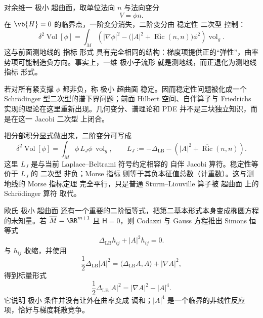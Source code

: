 对余维一 极小 超曲面，取单位法向 $n$ 与法向变分
\[
V=\phi n.
\]
在 $\vb{H}=0$ 的临界点，一阶变分消失，二阶变分由 稳定性 二次型 控制：
\begin{equation}
{
\delta^2\operatorname{Vol}[\phi]
=
\int_M
\left(
|\nabla\phi|^2
-\bigl(|A|^2+\overline{\operatorname{Ric}}(n,n)\bigr)\phi^2
\right)\operatorname{vol}_g
}.
\label{eq:math-dg-minimal-second-variation}
\end{equation}
这与前面测地线的 指标 形式 具有完全相同的结构：梯度项提供正的``弹性''，曲率势项可能制造负方向。事实上，一维 极小子流形 就是测地线，而正退化为测地线 指标 形式。

若对所有紧支撑 $\phi$ 都非负，称 极小 超曲面 稳定。因而稳定性问题被化成一个 Schrödinger 型二次型的谱下界问题；前面 Hilbert 空间、自伴算子与 Friedrichs 实现的理论在这里重新出现。几何变分、谱理论和 PDE 并不是三块独立知识，而是在这一 Jacobi 二次型 上闭合。

把分部积分显式做出来，二阶变分可写成
\begin{equation*}\delta^2\operatorname{Vol}[\phi]
=\int_M\phi\,L_J\phi\,\operatorname{vol}_g,
\qquad
L_J:=-\Delta_{\mathrm{LB}}
-\left(|A|^2+\overline{\operatorname{Ric}}(n,n)\right).\end{equation*}
这里 $L_J$ 是与当前 Laplace--Beltrami 符号约定相容的 自伴 Jacobi 算符。稳定性等价于 $L_J$ 的 二次型 非负；Morse 指标 则等于其负本征值总数（计重数）。这与测地线的 Morse 指标定理 完全平行，只是普通 Sturm--Liouville 算子被 超曲面 上的 Schrödinger 算符 取代。

欧氏 极小 超曲面 还有一个重要的二阶恒等式，把第二基本形式本身变成椭圆方程的未知量。若 $\overline M=\RR^{m+1}$ 且 $\mathsf H=0$，则 Codazzi 与 Gauss 方程推出 Simons 恒等式
\begin{equation}
{
\Delta_{\mathrm{LB}}h_{ij}
+|A|^2h_{ij}=0.
}
\label{eq:math-dg-simons-hessian}
\end{equation}
与 $h_{ij}$ 收缩，并使用
\[
\frac12\Delta_{\mathrm{LB}}|A|^2
=\langle\Delta_{\mathrm{LB}}A,A\rangle
+|\nabla A|^2,
\]
得到标量形式
\begin{equation*}{
\frac12\Delta_{\mathrm{LB}}|A|^2
=|\nabla A|^2-|A|^4.
}\end{equation*}
它说明 极小 条件并没有让外在曲率变成 调和；$|A|^4$ 是一个临界的非线性反应项，恰好与梯度耗散竞争。


